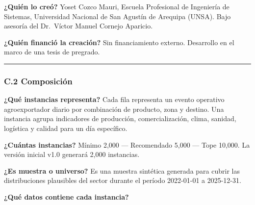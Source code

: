 \textbf{¿Quién lo creó?} Yoset Cozco Mauri, Escuela Profesional de
Ingeniería de Sistemas, Universidad Nacional de San Agustín de Arequipa
(UNSA). Bajo asesoría del Dr.~Víctor Manuel Cornejo Aparicio.

\textbf{¿Quién financió la creación?} Sin financiamiento externo.
Desarrollo en el marco de una tesis de pregrado.

\begin{center}\rule{0.5\linewidth}{0.5pt}\end{center}

\subsubsection{C.2 Composición}\label{c.2-composiciuxf3n}

\textbf{¿Qué instancias representa?} Cada fila representa un evento
operativo agroexportador diario por combinación de producto, zona y
destino. Una instancia agrupa indicadores de producción,
comercialización, clima, sanidad, logística y calidad para un día
específico.

\textbf{¿Cuántas instancias?} Mínimo 2,000 --- Recomendado 5,000 ---
Tope 10,000. La versión inicial v1.0 generará 2,000 instancias.

\textbf{¿Es muestra o universo?} Es una muestra sintética generada para
cubrir las distribuciones plausibles del sector durante el período
2022-01-01 a 2025-12-31.

\textbf{¿Qué datos contiene cada instancia?}

